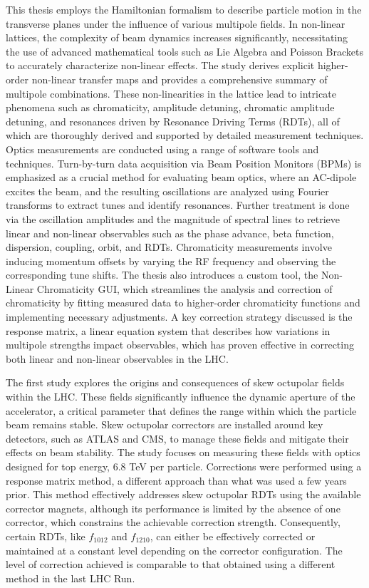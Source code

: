 {%
This thesis employs the Hamiltonian formalism to describe particle motion in the transverse planes
under the influence of various multipole fields. In non-linear lattices, the complexity of beam
dynamics increases significantly, necessitating the use of advanced mathematical tools such as Lie
Algebra and Poisson Brackets to accurately characterize non-linear effects. The study derives
explicit higher-order non-linear transfer maps and provides a comprehensive summary of multipole
combinations. These non-linearities in the lattice lead to intricate phenomena such as chromaticity,
amplitude detuning, chromatic amplitude detuning, and resonances driven by Resonance Driving Terms
(RDTs), all of which are thoroughly derived and supported by detailed measurement techniques. \\
\indent
Optics measurements are conducted using a range of software tools and techniques. Turn-by-turn data
acquisition via Beam Position Monitors (BPMs) is emphasized as a crucial method for evaluating beam
optics, where an AC-dipole excites the beam, and the resulting oscillations are analyzed using
Fourier transforms to extract tunes and identify resonances.  Further treatment is done via the
oscillation amplitudes and the magnitude of spectral lines to retrieve linear and non-linear
observables such as the phase advance, beta function, dispersion, coupling, orbit, and RDTs.
Chromaticity measurements involve inducing momentum offsets by varying the RF frequency and
observing the corresponding tune shifts. The thesis also introduces a custom tool, the Non-Linear
Chromaticity GUI, which streamlines the analysis and correction of chromaticity by fitting measured
data to higher-order chromaticity functions and implementing necessary adjustments. A key correction
strategy discussed is the response matrix, a linear equation system that describes how variations in
multipole strengths impact observables, which has proven effective in correcting both linear and
non-linear observables in the LHC.

The first study explores the origins and consequences of skew octupolar fields within the LHC. These
fields significantly influence the dynamic aperture of the accelerator, a critical parameter that
defines the range within which the particle beam remains stable. Skew octupolar correctors are
installed around key detectors, such as ATLAS and CMS, to manage these fields and mitigate their
effects on beam stability. The study focuses on measuring these fields with optics designed for top
energy, 6.8 TeV per particle. Corrections were performed using a response matrix method, a different
approach than what was used a few years prior. This method effectively addresses skew octupolar RDTs
using the available corrector magnets, although its performance is limited by the absence of one
corrector, which constrains the achievable correction strength. Consequently, certain RDTs, like
$f_{1012}$ and $f_{1210}$, can either be effectively corrected or maintained at a constant level
depending on the corrector configuration. The level of correction achieved is comparable to that
obtained using a different method in the last LHC Run.

}
